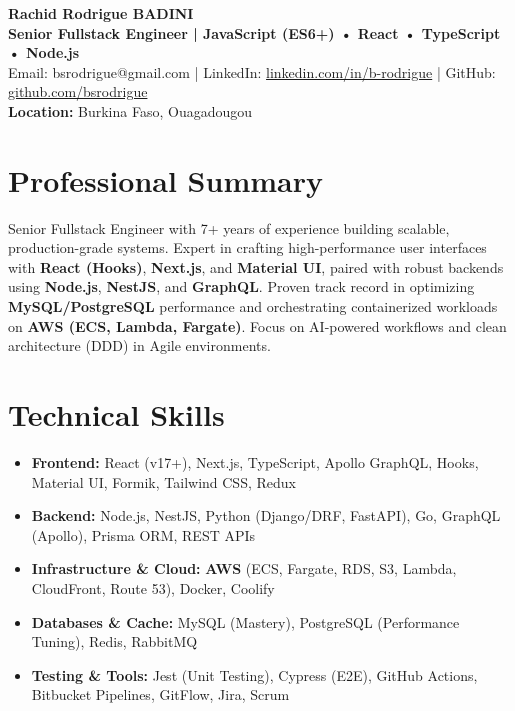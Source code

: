 \documentclass[a4paper,10pt]{article}
\begin{document}
\begin{center}
    {\LARGE\bfseries Rachid Rodrigue BADINI} \\[0.15cm]
    \textbf{Senior Fullstack Engineer | JavaScript (ES6+) • React • TypeScript • Node.js} \\
    Email: bsrodrigue@gmail.com | LinkedIn: \href{https://linkedin.com/in/b-rodrigue}{linkedin.com/in/b-rodrigue} | GitHub: \href{https://github.com/bsrodrigue}{github.com/bsrodrigue} \\
    \textbf{Location:} Burkina Faso, Ouagadougou
\end{center}

\vspace{0.1cm}

\section*{Professional Summary}
Senior Fullstack Engineer with 7+ years of experience building scalable, production-grade systems. Expert in crafting high-performance user interfaces with \textbf{React (Hooks)}, \textbf{Next.js}, and \textbf{Material UI}, paired with robust backends using \textbf{Node.js}, \textbf{NestJS}, and \textbf{GraphQL}. Proven track record in optimizing \textbf{MySQL/PostgreSQL} performance and orchestrating containerized workloads on \textbf{AWS (ECS, Lambda, Fargate)}. Focus on AI-powered workflows and clean architecture (DDD) in Agile environments.

\section*{Technical Skills}
\begin{itemize}[leftmargin=*,nosep]
    \item \textbf{Frontend:} React (v17+), Next.js, TypeScript, Apollo GraphQL, Hooks, Material UI, Formik, Tailwind CSS, Redux
    \item \textbf{Backend:} Node.js, NestJS, Python (Django/DRF, FastAPI), Go, GraphQL (Apollo), Prisma ORM, REST APIs
    \item \textbf{Infrastructure \& Cloud:} \textbf{AWS} (ECS, Fargate, RDS, S3, Lambda, CloudFront, Route 53), Docker, Coolify
    \item \textbf{Databases \& Cache:} MySQL (Mastery), PostgreSQL (Performance Tuning), Redis, RabbitMQ
    \item \textbf{Testing \& Tools:} Jest (Unit Testing), Cypress (E2E), GitHub Actions, Bitbucket Pipelines, GitFlow, Jira, Scrum
\end{itemize}
\end{document}
